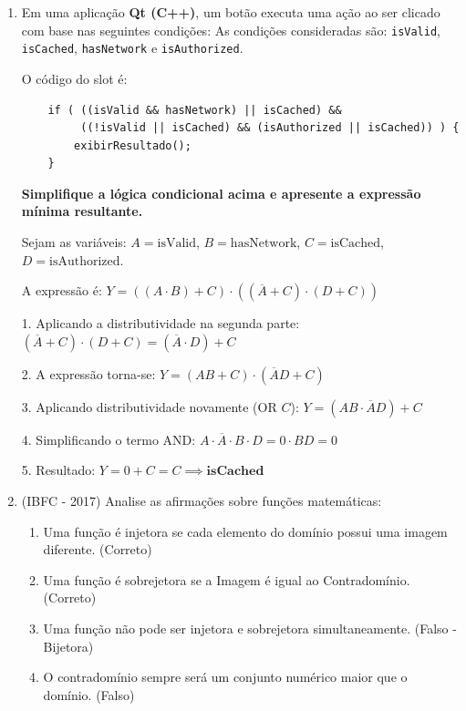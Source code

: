 \documentclass[12pt,a4paper]{article}
\begin{document}
\begin{enumerate}
     \item Em uma aplicação \textbf{Qt (C++)}, um botão executa uma ação ao ser clicado com base nas seguintes condições:
As condições consideradas são: \texttt{isValid}, \texttt{isCached}, \texttt{hasNetwork} e \texttt{isAuthorized}.
    
    O código do slot é:
    
    \begin{codeblock}
    \begin{verbatim}
    if ( ((isValid && hasNetwork) || isCached) &&
         ((!isValid || isCached) && (isAuthorized || isCached)) ) {
        exibirResultado();
    }
    \end{verbatim}
    \end{codeblock}

    \textbf{Simplifique a lógica condicional acima e apresente a expressão mínima resultante.}
    
    \begin{respostabox}
    Sejam as variáveis: $A = \text{isValid}$, $B = \text{hasNetwork}$, $C = \text{isCached}$, $D = \text{isAuthorized}$.
    
    A expressão é: $Y = ((A \cdot B) + C) \cdot ((\overline{A} + C) \cdot (D + C))$
    
    1. Aplicando a distributividade na segunda parte: $(\overline{A} + C) \cdot (D + C) = (\overline{A} \cdot D) + C$
    
    2. A expressão torna-se: $Y = (AB + C) \cdot (\overline{A}D + C)$
    
    3. Aplicando distributividade novamente (OR $C$): $Y = (AB \cdot \overline{A}D) + C$
    
    4. Simplificando o termo AND: $A \cdot \overline{A} \cdot B \cdot D = 0 \cdot BD = 0$
    
    5. Resultado: $Y = 0 + C = C \implies \mathbf{isCached}$
    \end{respostabox}

    \item (IBFC - 2017) Analise as afirmações sobre funções matemáticas:
    \begin{enumerate}[label=\Roman*.]
        \item Uma função é injetora se cada elemento do domínio possui uma imagem diferente. (Correto)
        \item Uma função é sobrejetora se a Imagem é igual ao Contradomínio. (Correto)
        \item Uma função não pode ser injetora e sobrejetora simultaneamente. (Falso - Bijetora)
        \item O contradomínio sempre será um conjunto numérico maior que o domínio. (Falso)
    \end{enumerate}


\end{enumerate}
\end{document}
